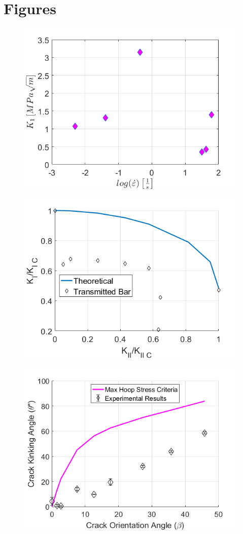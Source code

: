 \documentclass[12pt]{article}
\begin{document}
\section{Figures} %

\begin{figure}[H]
	\centering
	\includegraphics[width=.67\textwidth,scale=1]{Goal1_b.png}
	\caption{}
	\label{fig:Goal1}
\end{figure}

\begin{figure}[H]
	\centering
	\includegraphics[width=.67\textwidth,scale=1]{Goal2.png}
	\caption{}
	\label{fig:Goal2}
\end{figure}

\begin{figure}[H]
	\centering
	\includegraphics[width=.67\textwidth,scale=1]{Goal3_b.png}
	\caption{}
	\label{fig:Goal3}
\end{figure}




\end{document}
